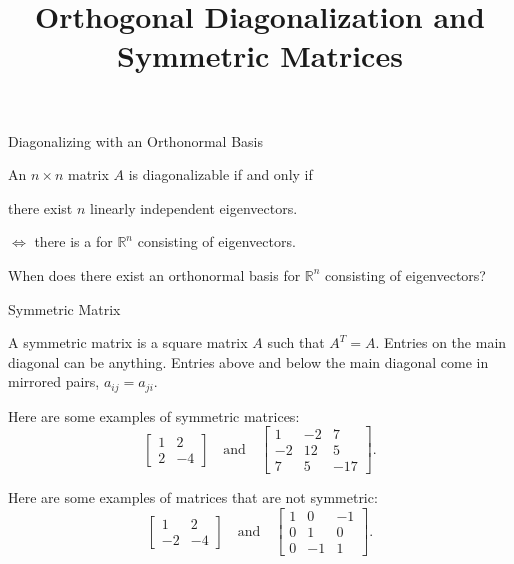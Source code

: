 \documentclass[xcolor=dvipsnames,aspectratio=169,t]{beamer}
\title{Orthogonal Diagonalization and Symmetric Matrices}
\begin{document}
\maketitle

\begin{frame}{Diagonalizing with an Orthonormal Basis}
  \bigskip
  
  \textbf{}
  An $n\times n$ matrix $A$ is \alert{diagonalizable} if and only if
  \smallskip
  
  \qquad \quad there exist $n$ linearly independent eigenvectors.
  \smallskip
  
  \pause
  \qquad \quad $\Leftrightarrow$ there is a  for $\mathbb{R}^n$ consisting of eigenvectors.
  
  \vspace*{1.5em}
  
  \textbf{}
  When does there exist an \alert{orthonormal basis} for $\mathbb{R}^n$ consisting of eigenvectors?
  
\end{frame}


\begin{frame}{Symmetric Matrix}
  \begin{definition}
    A \alert{symmetric matrix} is a square matrix $A$ such that $A^T=A$.
    \bi
    \ii Entries on the main diagonal can be anything.
    \ii Entries above and below the main diagonal come in mirrored pairs, $a_{ij} = a_{ji}$.
    \ei
  \end{definition}


Here are some examples of symmetric matrices:
\[ \begin{bmatrix} 1 & 2 \\ 2 & - 4 \end{bmatrix} \quad \mbox{and} \quad \begin{bmatrix} 1 & -2 & 7 \\  -2 & 12 & 5 \\ 7 & 5 & -17 \end{bmatrix}. \]

Here are some examples of matrices that are not symmetric:
\[ \begin{bmatrix} 1 & 2 \\ -2 & - 4 \end{bmatrix} \quad \mbox{and} \quad \begin{bmatrix} 1 & 0 & -1 \\  0 & 1 & 0 \\ 0 & -1 & 1 \end{bmatrix}. \]

\end{frame}
\end{document}
